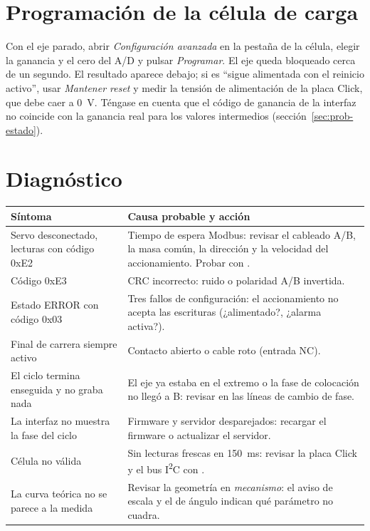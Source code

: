 \section{Programación de la célula de carga}

Con el eje parado, abrir \emph{Configuración avanzada} en la pestaña de la célula, elegir la ganancia
y el cero del A/D y pulsar \emph{Programar}. El eje queda bloqueado cerca de un segundo. El resultado
aparece debajo; si es ``sigue alimentada con el reinicio activo'', usar \emph{Mantener reset} y medir
la tensión de alimentación de la placa Click, que debe caer a \SI{0}{\volt}. Téngase en cuenta que
el código de ganancia de la interfaz no coincide con la ganancia real para los valores intermedios
(sección~\ref{sec:prob-estado}).

\section{Diagnóstico}

\begin{longtable}{@{}L{0.34\textwidth}L{0.6\textwidth}@{}}
\toprule
Síntoma & Causa probable y acción \\
\midrule
\endhead
Servo desconectado, lecturas con código 0xE2 & Tiempo de espera Modbus: revisar el cableado A/B, la masa común, la dirección y la velocidad del accionamiento. Probar con . \\
Código 0xE3 & CRC incorrecto: ruido o polaridad A/B invertida. \\
Estado ERROR con código 0x03 & Tres fallos de configuración: el accionamiento no acepta las escrituras (¿alimentado?, ¿alarma activa?). \\
Final de carrera siempre activo & Contacto abierto o cable roto (entrada NC). \\
El ciclo termina enseguida y no graba nada & El eje ya estaba en el extremo o la fase de colocación no llegó a B: revisar en  las líneas de cambio de fase. \\
La interfaz no muestra la fase del ciclo & Firmware y servidor desparejados: recargar el firmware o actualizar el servidor. \\
Célula no válida & Sin lecturas frescas en \SI{150}{\milli\second}: revisar la placa Click y el bus I\textsuperscript{2}C con . \\
La curva teórica no se parece a la medida & Revisar la geometría en \emph{mecanismo}: el aviso de escala y el de ángulo indican qué parámetro no cuadra. \\
\bottomrule
\end{longtable}

